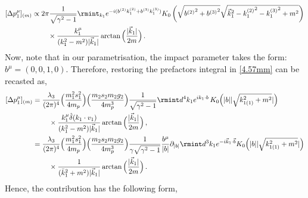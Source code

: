 \begin{align}
    \begin{split}
          [\Delta p_1^{\mu}]_{(m)}&\propto 2 \pi \frac{1}{\sqrt{\gamma^2-1}}\rmint_{k_1} e^{-i ({b^{(2)}} {k_1^{(2)}}+{b^{(3)}}{k_1^{(3)}})} K_0\left(\sqrt{{b^{(2)}}^2+{b^{(3)}}^2} \sqrt{\vec k_1^2-{k_1^{(2)}}^2-{k_1^{(3)}}^2+m^2}\right)\\ &\hspace{0.8cm}\times\frac{k_1^\mu}{(k_1^2-m^2)|\vec k_1|}\arctan\Big(\frac{|\vec k_1|}{2m}\Big)\,.\label{4.57mm}
    \end{split}
\end{align}
Now, note that in our parametrisation, the impact parameter takes the form: $b^{\mu}=(0,0,1,0)$. Therefore, restoring the prefactors integral in \eqref{4.57mm} can be recasted as,
\begin{align}
    \begin{split}
         [\Delta p_1^{\mu}]_{(m)}&=\frac{\lambda_3}{(2\pi)^4}\Big(\frac{m_1^2 s_1^2}{4m_p}\Big)\Big(\frac{m_2 s_2 m_2 g_2 }{4m_p^3}\Big)\frac{1}{\sqrt{\gamma^2-1}}\rmint d^4 k_1 e^{ik_1\cdot b}\,K_{0}\Big(|b||\sqrt{k_{1(1)}^2+m^2}|\Big)\\ &
        \hspace{0.8cm}\times\frac{k_1^\mu\hat\delta(k_1\cdot v_1)}{(k_1^2-m^2)|\vec k_1|}\arctan\Big(\frac{|\vec k_1|}{2m}\Big)\,,\\ &
        =\frac{\lambda_3}{(2\pi)^4}\Big(\frac{m_1^2 s_1^2}{4m_p}\Big)\Big(\frac{m_2 s_2 m_2 g_2 }{4m_p^3}\Big)\frac{1}{\gamma\sqrt{\gamma^2-1}}\frac{b^\mu}{|b|}\partial_{|b|}\rmint d^3 k_1 e^{-i \vec k_1\cdot \vec b}K_{0}\Big(|b||\sqrt{k_{1(1)}^2+m^2}|\Big)\\ &
        \hspace{0.8cm}\times\frac{1}{(\bar k_1^2+m^2)|\vec k_1|}\arctan\Big(\frac{|\vec k_1|}{2m}\Big)\,.\label{4.58}
    \end{split}
\end{align}
Hence, the contribution has the following form,

